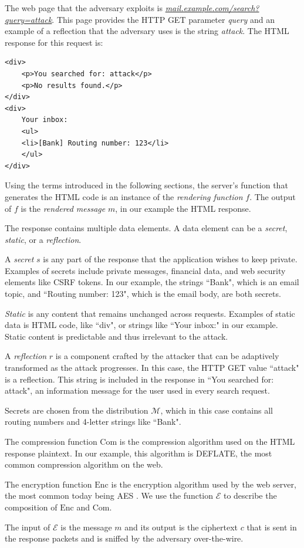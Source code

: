 The web page that the adversary exploits is
\textit{\url{mail.example.com/search?query=attack}}. This page provides the HTTP
GET parameter \textit{query} and an example of a reflection that the adversary
uses is the string \textit{attack}. The HTML response for this request is:

\begin{lstlisting}[basicstyle=\small\ttfamily]
<div>
    <p>You searched for: attack</p>
    <p>No results found.</p>
</div>
<div>
    Your inbox:
    <ul>
    <li>[Bank] Routing number: 123</li>
    </ul>
</div>
\end{lstlisting}

Using the terms introduced in the following sections, the server's function
that generates the HTML code
is an instance of the \textit{rendering function} $f$. The output of $f$ is the
\textit{rendered message} $m$, in our example the HTML response.

The response contains multiple data elements. A data element can be a
\textit{secret}, \textit{static}, or a \textit{reflection}.

A \textit{secret} $s$ is any part of the response that the application wishes to
keep private. Examples of secrets include private messages, financial data, and
web security elements like CSRF tokens. In our example,
the strings ``Bank", which is an email topic, and ``Routing number: 123", which
is the email body, are both secrets.

\textit{Static} is any content that remains unchanged across requests.  Examples
of static data is HTML code, like ``div", or strings like ``Your inbox:" in our
example.  Static content is predictable and thus irrelevant to the attack.

A \textit{reflection} $r$ is a component crafted by the attacker that can be
adaptively transformed as the attack progresses. In this case, the HTTP GET
value ``attack" is a reflection. This string is included in the response in ``You
searched for: attack", an information message for the user used in every
search request.

Secrets are chosen from the distribution $\mathcal{M}$, which in this case
contains all routing numbers and 4-letter strings like ``Bank".

The compression function $\textrm{Com}$ is the compression algorithm used on the
HTML response plaintext. In our example, this algorithm is DEFLATE, the most
common compression algorithm on the web.

The encryption function $\textrm{Enc}$ is the encryption algorithm used by the
web server, the most common today being AES \cite{daemen2013design}. We use the function
$\mathcal{E}$ to describe the composition of $\textrm{Enc}$ and $\textrm{Com}$.

The input of $\mathcal{E}$ is the message $m$ and its output is the
ciphertext $c$ that is sent in the response packets and is sniffed by the
adversary over-the-wire.
